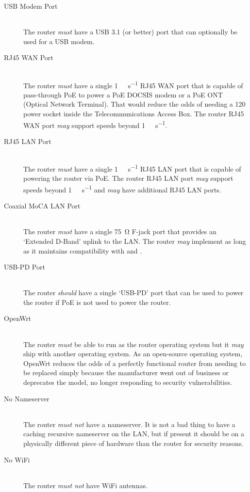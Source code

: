 \begin{description}
  \item[USB Modem Port] \hfill \\ The router \emph{must} have a USB 3.1 (or better) port that can optionally
       be used for a USB modem.
  \item[RJ45 WAN Port] \hfill \\ The router \emph{must} have a single \qty{1}{\giga\bit\per\second} RJ45 WAN port
       that is capable of pass-through PoE to power a PoE DOCSIS modem or a PoE ONT (Optical Network Terminal).
       That would reduce the odds of needing a \qty{120}{\vrms} power socket inside the Telecommunications Access
       Box. The router RJ45 WAN port \emph{may} support speeds beyond \qty{1}{\giga\bit\per\second}.
  \item[RJ45 LAN Port] \hfill \\ The router \emph{must} have a single \qty{1}{\giga\bit\per\second} RJ45 LAN port
       that is capable of powering the router via PoE. The router RJ45 LAN port \emph{may} support speeds beyond
       \qty{1}{\giga\bit\per\second} and \emph{may} have additional RJ45 LAN ports.
  \item[Coaxial MoCA LAN Port] \hfill \\ The router \emph{must} have a single \qty{75}{\ohm} F-jack port that
       provides an `Extended D-Band'  uplink to the LAN. The router \emph{may} implement 
       as long as it maintains compatibility with  and .
  \item[USB-PD Port] \hfill \\ The router \emph{should} have a single `USB-PD' port that can be used to power the
       router if PoE is not used to power the router.
  \item[OpenWrt] \hfill \\ The router \emph{must} be able to run  as the router
       operating system but it \emph{may} ship with another operating system. As an open-source operating system,
       OpenWrt reduces the odds of a perfectly functional router from needing to be replaced simply because the
       manufacturer went out of business or deprecates the model, no longer responding to security vulnerabilities.
  \item[No Nameserver] \hfill \\ The router \emph{must not} have a nameserver. It is not a bad thing to have a
       caching recursive nameserver on the LAN, but if present it should be on a physically different piece of
       hardware than the router for security reasons.
  \item[No WiFi] \hfill \\ The router \emph{must not} have WiFi antennas.
\end{description}

